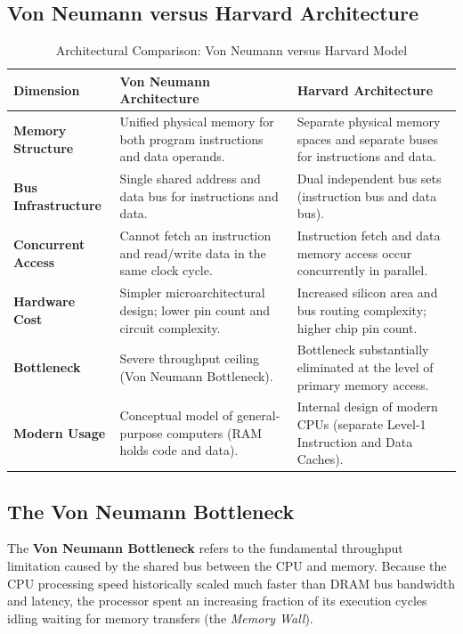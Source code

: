 \subsection{Von Neumann versus Harvard Architecture}
\begin{table}[htbp]
\centering
\small
\caption{Architectural Comparison: Von Neumann versus Harvard Model}
\label{tab:von_neumann_vs_harvard}
\begin{tabularx}{\textwidth}{l X X}
\toprule
\textbf{Dimension} & \textbf{Von Neumann Architecture} & \textbf{Harvard Architecture} \\
\midrule
\textbf{Memory Structure} & Unified physical memory for both program instructions and data operands. & Separate physical memory spaces and separate buses for instructions and data. \\
\textbf{Bus Infrastructure} & Single shared address and data bus for instructions and data. & Dual independent bus sets (instruction bus and data bus). \\
\textbf{Concurrent Access} & Cannot fetch an instruction and read/write data in the same clock cycle. & Instruction fetch and data memory access occur concurrently in parallel. \\
\textbf{Hardware Cost} & Simpler microarchitectural design; lower pin count and circuit complexity. & Increased silicon area and bus routing complexity; higher chip pin count. \\
\textbf{Bottleneck} & Severe throughput ceiling (Von Neumann Bottleneck). & Bottleneck substantially eliminated at the level of primary memory access. \\
\textbf{Modern Usage} & Conceptual model of general-purpose computers (RAM holds code and data). & Internal design of modern CPUs (separate Level-1 Instruction and Data Caches). \\
\bottomrule
\end{tabularx}
\end{table}

\subsection{The Von Neumann Bottleneck}
The \textbf{Von Neumann Bottleneck} refers to the fundamental throughput limitation caused by the shared bus between the CPU and memory. Because the CPU processing speed historically scaled much faster than DRAM bus bandwidth and latency, the processor spent an increasing fraction of its execution cycles idling waiting for memory transfers (the \textit{Memory Wall}).

